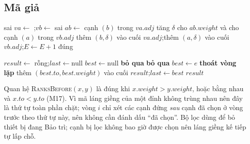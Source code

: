 \subsection{Mã giả}
\begin{algorithm}[H]
\caption{\textsc{AddCoBorrow}$(ids)$: cập nhật đồ thị theo một phiếu}
\begin{algorithmic}[1]
  \State {}
\EndFor
\end{algorithmic}
\end{algorithm}
\begin{algorithm}[H]
\caption{\textsc{AddEdgeWeight}$(a, b, \delta)$}
\begin{algorithmic}[1]
 \Return sai \EndIf{}
\State $va \gets$ ;\quad $vb \gets$ 
 \Return sai \EndIf
\State $ab \gets$ cạnh $(b)$ trong $va.adj$
  \State tăng $\delta$ cho $ab.weight$ và cho cạnh $(a)$ trong $vb.adj$
\Else
  \State thêm $(b,\delta)$ vào cuối $va.adj$;\quad thêm $(a,\delta)$ vào cuối $vb.adj$;\quad $E \gets E+1$
\EndIf
\State \Return đúng
\end{algorithmic}
\end{algorithm}
\begin{algorithm}[H]
\caption{\textsc{TopNeighbors}$(id, k, accept)$: chọn $k$ lần, không sắp xếp, không mảng phụ}
\begin{algorithmic}[1]
\State $result \gets$ rỗng;\quad $last \gets \text{null}$
  \State $best \gets \text{null}$
     \State \textbf{bỏ qua} \EndIf
     \State \textbf{bỏ qua} \EndIf
     \State $best \gets e$ \EndIf
  \EndFor
   \textbf{thoát vòng lặp} \EndIf
  \State thêm $(best.to, best.weight)$ vào cuối $result$;\quad $last \gets best$
\EndFor
\State \Return $result$
\end{algorithmic}
\end{algorithm}
Quan hệ \textsc{RanksBefore}$(x,y)$ là đúng khi $x.weight > y.weight$, hoặc bằng nhau và $x.to < y.to$ (M17). Vì mã láng giềng của một đỉnh không trùng nhau nên đây là thứ tự toàn phần chặt; vòng $i$ chỉ xét các cạnh đứng \emph{sau} cạnh đã chọn ở vòng trước theo thứ tự này, nên không cần đánh dấu ``đã chọn''. Bộ lọc  dùng để bỏ thiết bị đang Bảo trì; cạnh bị lọc không bao giờ được chọn nên láng giềng kế tiếp tự lấp chỗ.

